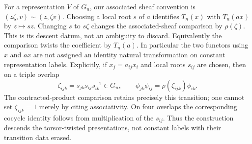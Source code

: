 \documentclass[11pt]{article}
\theoremstyle{definition}
\theoremstyle{remark}
\begin{document}
For a representation $V$ of $G_n$, our associated sheaf convention is
$(z\zeta,v)\sim(z,\zeta v)$.  Choosing a local root $s$ of $a$
identifies $T_n(x)$ with $T_n(ax)$ by $z\mapsto sz$.
Changing $s$ to $s\zeta$ changes the associated-sheaf comparison by
$\rho(\zeta)$.  This is its descent datum, not an ambiguity to discard.
Equivalently the comparison twists the coefficient by $T_n(a)$.
In particular the two functors using $x$ and $ax$ are not assigned
an identity natural transformation on constant representation labels.
Explicitly, if $x_j=a_{ij}x_i$ and local roots $s_{ij}$ are chosen,
then on a triple overlap
\[
 \zeta_{ijk}=s_{jk}s_{ij}s_{ik}^{-1}\in G_n,
 \qquad \phi_{jk}\phi_{ij}=\rho(\zeta_{ijk})\phi_{ik}.
\]
The contracted-product comparison retains precisely this transition;
one cannot set $\zeta_{ijk}=1$ merely by citing associativity.
On four overlaps the corresponding cocycle identity follows from
multiplication of the $s_{ij}$.  Thus the construction descends the
torsor-twisted presentations, not constant labels with their
transition data erased.
\end{document}
